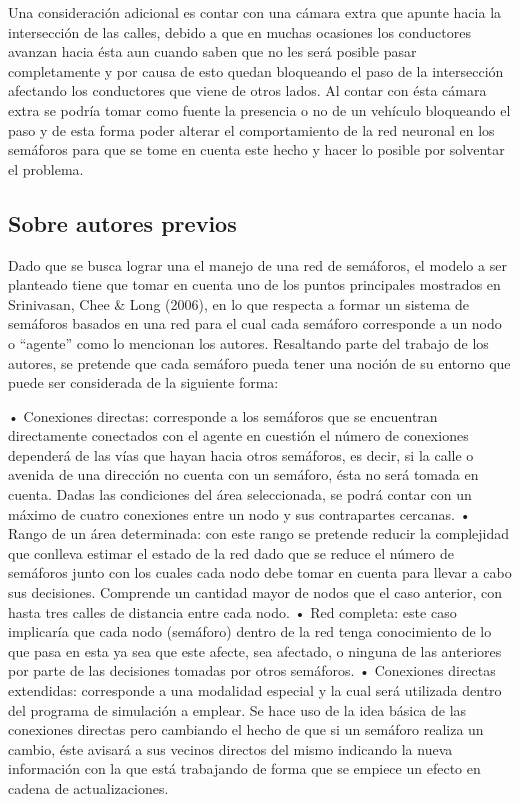 Una consideraci\'{o}n adicional es contar con una c\'{a}mara extra que apunte hacia la intersecci\'{o}n de las calles, debido a que en muchas ocasiones los conductores avanzan hacia \'{e}sta aun cuando saben que no les ser\'{a} posible pasar completamente y por causa de esto quedan bloqueando el paso de la intersecci\'{o}n afectando los conductores que viene de otros lados. Al contar con \'{e}sta c\'{a}mara extra se podr\'{i}a tomar como fuente la presencia o no de un veh\'{i}culo bloqueando el paso y de esta forma poder alterar el comportamiento de la red neuronal en los sem\'{a}foros para que se tome en cuenta este hecho y hacer lo posible por solventar el problema.


\subsection{Sobre autores previos}

Dado que se busca lograr una el manejo de una red de sem\'{a}foros, el modelo a ser planteado tiene que tomar en cuenta uno de los puntos principales mostrados en Srinivasan, Chee & Long (2006), en lo que respecta a formar un sistema de sem\'{a}foros basados en una red para el cual cada sem\'{a}foro corresponde a un nodo o “agente” como lo mencionan los autores. Resaltando parte del trabajo de los autores, se pretende que cada sem\'{a}foro pueda tener una noci\'{o}n de su entorno que puede ser considerada de la siguiente forma:

•	Conexiones directas: corresponde a los sem\'{a}foros que se encuentran directamente conectados con el agente en cuesti\'{o}n el n\'{u}mero de conexiones depender\'{a} de las v\'{i}as que hayan hacia otros sem\'{a}foros, es decir, si la calle o avenida de una direcci\'{o}n no cuenta con un sem\'{a}foro, \'{e}sta no ser\'{a} tomada en cuenta. Dadas las condiciones del \'{a}rea seleccionada, se podr\'{a} contar con un m\'{a}ximo de cuatro conexiones entre un nodo y sus contrapartes cercanas. 
•	Rango de un \'{a}rea determinada: con este rango se pretende reducir la complejidad que conlleva estimar el estado de la red dado que se reduce el n\'{u}mero de sem\'{a}foros junto con los cuales cada nodo debe tomar en cuenta para llevar a cabo sus decisiones. Comprende un cantidad mayor de nodos que el caso anterior, con hasta tres calles de distancia entre cada nodo.
•	Red completa: este caso implicar\'{i}a que cada nodo (sem\'{a}foro) dentro de la red tenga conocimiento de lo que pasa en esta ya sea que este afecte, sea afectado, o ninguna de las anteriores por parte de las decisiones tomadas por otros sem\'{a}foros.
•	Conexiones directas extendidas: corresponde a una modalidad especial y la cual ser\'{a} utilizada dentro del programa de simulaci\'{o}n a emplear. Se hace uso de la idea b\'{a}sica de las conexiones directas pero cambiando el hecho de que si un sem\'{a}foro realiza un cambio, \'{e}ste avisar\'{a} a sus vecinos directos del mismo indicando la nueva informaci\'{o}n con la que est\'{a} trabajando de forma que se empiece un efecto en cadena de actualizaciones.


